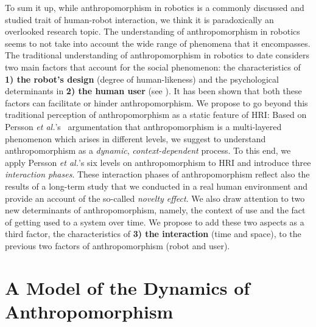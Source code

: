 \documentclass{acm_proc_article-sp}
\begin{document}
To sum it up, while anthropomorphism in robotics is a commonly discussed and
studied trait of human-robot interaction, we think it is paradoxically an
overlooked research topic. The understanding of anthropomorphism in robotics
seems to not take into account the wide range of phenomena that it encompasses.
The traditional understanding of anthropomorphism in robotics to date considers
two main factors that account for the social phenomenon: the characteristics of
\textbf{1) the robot's design} (degree of human-likeness) and the psychological
determinants in \textbf{2) the human user} (see \cite{epley_seeing_2007}). It
has been shown that both these factors can facilitate or hinder
anthropomorphism. We propose to go beyond this traditional perception of
anthropomorphism as a static feature of HRI: Based on Persson \textit{et
al.}'s~\cite{persson_anthropomorphism_2000} argumentation that anthropomorphism
is a multi-layered phenomenon which arises in different levels, we suggest to
understand anthropomorphism as a \emph{dynamic}, \emph{context-dependent}
process. To this end, we apply Persson \textit{et al.}'s six levels on
anthropomorphism to HRI and introduce three \emph{interaction phases}. These
interaction phases of anthropomorphism reflect also the results of a long-term
study that we conducted in a real human environment and provide an account of
the so-called \textit{novelty effect}. We also draw attention to two new
determinants of anthropomorphism, namely, the context of use and the fact of
getting used to a system over time. We propose to add these two aspects as a
third factor, the characteristics of \textbf{3) the interaction} (time and
space), to the previous two factors of anthropomorphism (robot and user). 

	
\section{A Model of the Dynamics of Anthropomorphism}
\label{sec:dynamics_model}
\end{document}
